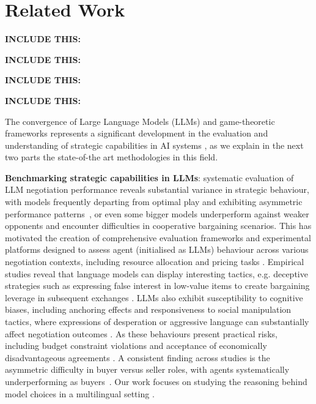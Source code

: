 \documentclass[11pt]{article}
\begin{document}
\section{Related Work}

\textbf{INCLUDE THIS:} \cite{qi-etal-2025-models}

\textbf{INCLUDE THIS:} \cite{garcia2025reproducibilitystudycooperationcompetition}

\textbf{INCLUDE THIS:} \cite{pollo2025re}

\textbf{INCLUDE THIS:} \cite{abdelnabi2024llmdeliberation}

The convergence of Large Language Models (LLMs) and game-theoretic frameworks represents a significant development in the evaluation and understanding of strategic capabilities in AI systems \cite{sun2025gametheorymeetslarge}, as we explain in the next two parts the state-of-the art methodologies in this field.

\textbf{Benchmarking strategic capabilities in LLMs}: systematic evaluation of LLM negotiation performance reveals substantial variance in strategic behaviour, with models frequently departing from optimal play and exhibiting asymmetric performance patterns~\cite{DBLP:conf/iclr/DavidsonVK024, DBLP:journals/corr/abs-2411-05990,DBLP:journals/corr/abs-2305-16867}, or even some bigger models underperform against weaker opponents and encounter difficulties in cooperative bargaining scenarios. This has motivated the creation of comprehensive evaluation frameworks and experimental platforms designed to assess agent (initialised as LLMs) behaviour across various negotiation contexts, including resource allocation and pricing tasks \cite{DBLP:conf/icml/0001CYTJ024, DBLP:conf/acl/Xia0RMZ0024}.
Empirical studies reveal that language models can display interesting tactics, e.g. deceptive strategies such as expressing false interest in low-value items to create bargaining leverage in subsequent exchanges \cite{lewis-etal-2017-deal}. LLMs also exhibit susceptibility to cognitive biases, including anchoring effects and responsiveness to social manipulation tactics, where expressions of desperation or aggressive language can substantially affect negotiation outcomes \cite{DBLP:conf/icml/0001CYTJ024}. As these behaviours present practical risks, including budget constraint violations and acceptance of economically disadvantageous agreements \cite{DBLP:journals/corr/abs-2506-00073}. A consistent finding across studies is the asymmetric difficulty in buyer versus seller roles, with agents systematically underperforming as buyers~\cite{DBLP:conf/acl/Xia0RMZ0024}. Our work focuses on studying the reasoning behind model choices in a multilingual setting \cite{DBLP:journals/corr/abs-2502-09457}.
\end{document}
